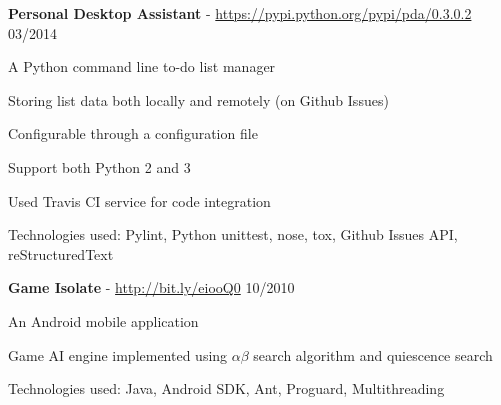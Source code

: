 \documentclass[margin,line]{resume}
\begin{document}
\begin{resume}
    \textbf{Personal Desktop Assistant} - \url{https://pypi.python.org/pypi/pda/0.3.0.2} \hfill 03/2014 \vspace{-3mm}\\\vspace{-1mm}%
      \begin{list2}
       \item A Python command line to-do list manager
       \item Storing list data both locally and remotely (on Github Issues)
       \item Configurable through a configuration file
       \item Support both Python 2 and 3
       \item Used Travis CI service for code integration
       \item Technologies used: Pylint, Python unittest, nose, tox, Github Issues API, reStructuredText
      \end{list2}

    \textbf{Game Isolate} - \url{http://bit.ly/eiooQ0} \hfill 10/2010 \vspace{-3mm}\\\vspace{-1mm}%
      \begin{list2}
       \item An Android mobile application
       \item Game AI engine implemented using $\alpha \beta$ search algorithm and quiescence search
       \item Technologies used: Java, Android SDK, Ant, Proguard, Multithreading
      \end{list2}

\end{resume}
\end{document}

